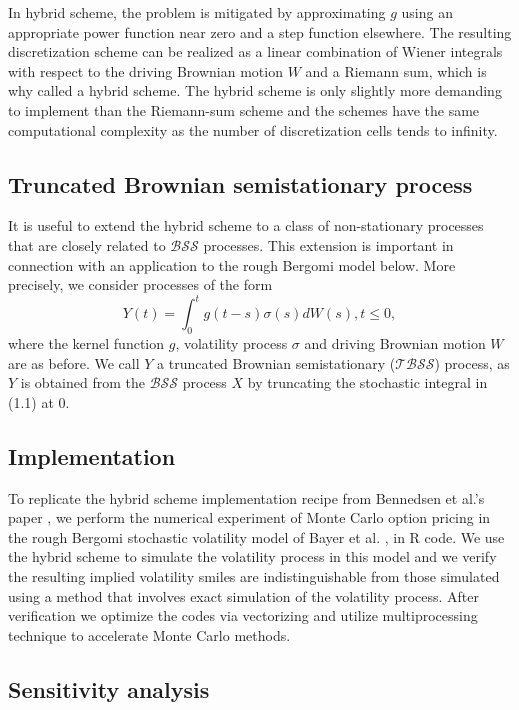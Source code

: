 \documentclass[12pt]{article}
\numberwithin{equation}{section}
\begin{document}
In hybrid scheme, the problem is mitigated by approximating $g$ using an appropriate power function near zero and a step function elsewhere. The resulting discretization scheme can be realized as a linear combination of Wiener integrals with respect to the driving Brownian motion $W$ and a Riemann sum, which is why called a hybrid scheme. The hybrid scheme is only slightly more demanding to implement than the Riemann-sum scheme and the schemes have the same computational complexity as the number of discretization cells tends to infinity.
        
\subsection{Truncated Brownian semistationary process}
    
It is useful to extend the hybrid scheme to a class of non-stationary processes that are closely related to $\mathcal{BSS}$ processes. This extension is important in connection with an application to the rough Bergomi model below. More precisely, we consider processes of the form
\begin{equation}
  Y(t) = \int_0^tg(t-s)\sigma(s)dW(s), t\le 0,
\end{equation}
where the kernel function $g$, volatility process $\sigma$ and driving Brownian motion $W$ are as before. We call $Y$ a truncated Brownian semistationary ($\mathcal{TBSS}$) process, as $Y$ is obtained from the $\mathcal{BSS}$ process $X$ by truncating the stochastic integral in (1.1) at $0$.
    
\subsection{Implementation}
    
To replicate the hybrid scheme implementation recipe from Bennedsen et al.'s paper \cite{bennedsen2015hybrid}, we perform the numerical experiment of Monte Carlo option pricing in the rough Bergomi stochastic volatility model of Bayer et al. \cite{bayer2015pricing}, in R code. We use the hybrid scheme to simulate the volatility process in this model and we verify the resulting implied volatility smiles are indistinguishable from those simulated using a method that involves exact simulation of the volatility process. After verification we optimize the codes via vectorizing and utilize multiprocessing technique to accelerate Monte Carlo methods.
    
\subsection{Sensitivity analysis}
    
\end{document}
